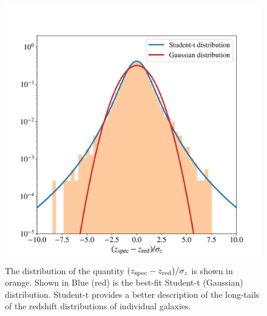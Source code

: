 \documentclass[fleqn,usenatbib,useAMS]{mnras}
\begin{document}
\begin{figure}
    \includegraphics[width = \columnwidth]{figures_tmp/student_t.png}
    \caption{The distribution of the quantity $(z_{\rm spec} - z_{\rm red})/\sigma_z$ is shown in orange. Shown in Blue (red) is the best-fit Student-t (Gaussian) distribution. Student-t provides a better description of the long-tails of the redshift distributions of individual galaxies.}
    \label{fig:student-t}
\end{figure}
\end{document}
